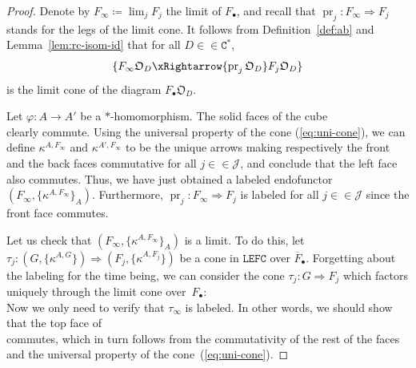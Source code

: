 \documentclass[10pt]{simplearticle}
\newcommand{\tikzinput}[1]{}
\newcommand{\pr}{\operatorname{pr}}
\newcommand{\LEFC}{\mathbb{\mathtt{LEFC}}}
\newcommand{\Cstar}{\mathtt{C^{*}}}
\begin{document}
\begin{proof}
Denote by $F_{\infty}\coloneqq\lim_{j}F_{j}$ the limit of $F_{\bullet}$,
and recall that $\pr_{j}\colon F_{\infty}\Rightarrow F_{j}$ stands
for the legs of the limit cone. It follows from Definition~\ref{def:ab}
and Lemma~\ref{lem:rc-isom-id} that for all $D\in\in\Cstar$,
\begin{equation}
\{F_{\infty}\mathfrak{O}_{D}\xRightarrow{\pr_{j}\mathfrak{O}_{D}}F_{j}\mathfrak{O}_{D}\}\label{eq:uni-cone}
\end{equation}
is the limit cone of the diagram $F_{\bullet}\mathfrak{O}_{D}$.

Let $\varphi\colon A\to A'$ be a $*$-homomorphism. The solid faces
of the cube
\[
\tikzinput{d268}
\]
clearly commute. Using the universal property of the cone (\ref{eq:uni-cone}),
we can define $\kappa^{A,F_{\infty}}$ and $\kappa^{A',F_{\infty}}$
to be the unique arrows making respectively the front and the back
faces commutative for all $j\in\in\mathcal{J}$, and conclude that
the left face also commutes. Thus, we have just obtained a labeled
endofunctor $(F_{\infty},\{\kappa^{A,F_{\infty}}\}_{A})$. Furthermore,
$\pr_{j}\colon F_{\infty}\Rightarrow F_{j}$ is labeled for all $j\in\in\mathcal{J}$
since the front face commutes.

Let us check that $(F_{\infty},\{\kappa^{A,F_{\infty}}\}_{A})$ is
a limit. To do this, let $\tau_{j}\colon(G,\{\kappa^{A,G}\})\Rightarrow(F_{j},\{\kappa^{A,F_{j}}\})$
be a cone in $\LEFC$ over $\overline{F}_{\bullet}$. Forgetting about
the labeling for the time being, we can consider the cone $\tau_{j}\colon G\Rightarrow F_{j}$
which factors uniquely through the limit cone over~$F_{\bullet}$:
\[
\tikzinput{d270}
\]
Now we only need to verify that $\tau_{\infty}$ is labeled. In other
words, we should show that the top face of
\[
\tikzinput{d269}
\]
commutes, which in turn follows from the commutativity of the rest
of the faces and the universal property of the cone~(\ref{eq:uni-cone}).
\end{proof}
\end{document}

